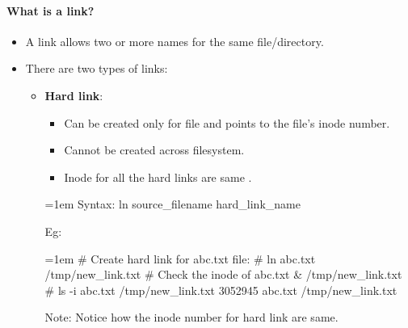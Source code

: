 \setlength{\columnsep}{3pt}
\begin{flushleft}
	\bigskip
	\paragraph{What is a link?}
	\begin{itemize}
		\item A link allows two or more names for the same file/directory.
		\item There are two types of links:
		\begin{itemize}
			\item \textbf{Hard link}:
			\begin{itemize}
				\item Can be created only for file and points to the file's inode number.
				\item Cannot be created across filesystem.
				\item Inode for all the hard links are same .
			\end{itemize}
			
			\bigskip
			\begin{tcolorbox}[breakable,notitle,boxrule=-0pt,colback=pink,colframe=pink]
				\color{black}
				\font=1em
				Syntax: ln source\_filename  hard\_link\_name
				\font=4pt
			\end{tcolorbox}
			Eg:
			\bigskip
			\begin{tcolorbox}[breakable,notitle,boxrule=-0pt,colback=black,colframe=black]
				\font=1em
				\color{yellow}
				\# Create hard link for abc.txt file:
				\newline
				\color{green}
				\# ln abc.txt /tmp/new\_link.txt
				\newline
				\newline
				\color{yellow}
				\# Check the inode of abc.txt \& /tmp/new\_link.txt 
				\newline
				\color{green}
				\# ls -i abc.txt  /tmp/new\_link.txt
				\newline
				\color{white}
				3052945 abc.txt
				 /tmp/new\_link.txt
				\font=4pt
			\end{tcolorbox}
			\bigskip
			\begin{tcolorbox}[breakable,notitle,boxrule=1pt,colback=yellow,colframe=yellow]
				\color{black}
				Note: Notice how the inode number for hard link are same.
			\end{tcolorbox}
			

\end{itemize}
\end{itemize}
\end{flushleft}
